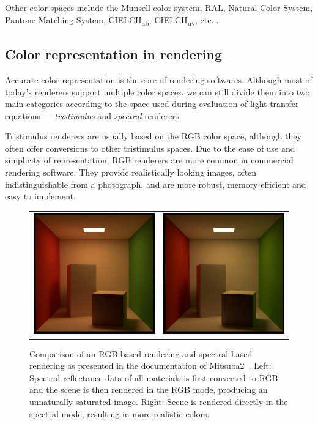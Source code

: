 Other color spaces include the Munsell color system, RAL, Natural Color System, Pantone Matching System, CIELCH\textsubscript{ab}, CIELCH\textsubscript{uv}, etc$\ldots$

\subsection{Color representation in rendering}

Accurate color representation is the core of rendering softwares. Although most of today's renderers support multiple color spaces, we can still divide them into two main categories according to the space used during evaluation of light transfer equations --- \emph{tristimulus} and \emph{spectral} renderers.

Tristimulus renderers are usually based on the RGB color space, although they often offer conversions to other tristimulus spaces. Due to the ease of use and simplicity of representation, RGB renderers are more common in commercial rendering software. They provide realistically looking images, often indistinguishable from a photograph, and are more robust, memory efficient and easy to implement.

\begin{figure}[t]
	\centering
	{\sffamily
		\begin{tabular}{cc}
			\includegraphics[width=0.45\linewidth]{img/mitsuba_rgb_mode.jpg}
			&
			\includegraphics[width=0.45\linewidth]{img/mitsuba_spectral_mode.jpg}\\
		\end{tabular}
	}
	\caption{Comparison of an RGB-based rendering and spectral-based rendering as presented in the documentation of Mitsuba2~\cite{Mitsuba2}. Left: Spectral reflectance data of all materials is first converted to RGB and the scene is then rendered in the RGB mode, producing an unnaturally saturated image. Right: Scene is rendered directly in the spectral mode, resulting in more realistic colors. }
	\label{fig:mitsubaRGBSpectralComparison}
\end{figure}

